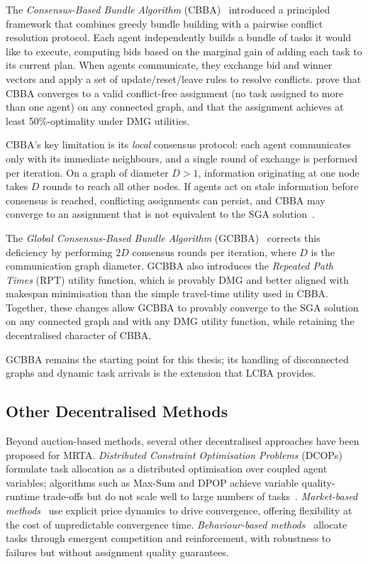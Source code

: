 The \emph{Consensus-Based Bundle Algorithm} (CBBA)~\cite{choi2009consensus}
introduced a principled framework that combines greedy bundle building with
a pairwise conflict resolution protocol.
Each agent independently builds a bundle of tasks it would like to execute,
computing bids based on the marginal gain of adding each task to its current
plan.
When agents communicate, they exchange bid and winner vectors and apply a set
of update/reset/leave rules to resolve conflicts.
\citeauthor{choi2009consensus} prove that CBBA converges to a valid
conflict-free assignment (no task assigned to more than one agent) on any
connected graph, and that the assignment achieves at least
50\%-optimality under DMG utilities.

CBBA's key limitation is its \emph{local} consensus protocol: each agent
communicates only with its immediate neighbours, and a single round of exchange
is performed per iteration.
On a graph of diameter $D > 1$, information originating at one node takes $D$
rounds to reach all other nodes.
If agents act on stale information before consensus is reached, conflicting
assignments can persist, and CBBA may converge to an assignment that is not
equivalent to the SGA solution~\cite{kha2025enhancing}.

The \emph{Global Consensus-Based Bundle Algorithm}
(GCBBA)~\cite{kha2025enhancing} corrects this deficiency by performing $2D$
consensus rounds per iteration, where $D$ is the communication graph diameter.
GCBBA also introduces the \emph{Repeated Path Times} (RPT) utility function,
which is provably DMG and better aligned with makespan minimisation than the
simple travel-time utility used in CBBA.
Together, these changes allow GCBBA to provably converge to the SGA solution
on any connected graph and with any DMG utility function, while retaining the
decentralised character of CBBA.

GCBBA remains the starting point for this thesis; its handling of disconnected
graphs and dynamic task arrivals is the extension that LCBA provides.


\subsection{Other Decentralised Methods}
\label{subsec:bg_other_decentralised}

Beyond auction-based methods, several other decentralised approaches have been
proposed for MRTA.
\emph{Distributed Constraint Optimisation Problems} (DCOPs) formulate task
allocation as a distributed optimisation over coupled agent variables;
algorithms such as Max-Sum and DPOP achieve variable quality-runtime trade-offs
but do not scale well to large numbers of tasks~\cite{chakraa2023optimization}.
\emph{Market-based methods}~\cite{quinton2023mrta} use explicit price dynamics
to drive convergence, offering flexibility at the cost of unpredictable
convergence time.
\emph{Behaviour-based methods}~\cite{parker1998alliance} allocate tasks
through emergent competition and reinforcement, with robustness to failures
but without assignment quality guarantees.


